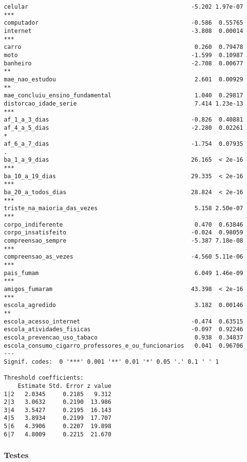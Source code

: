 \documentclass[
]{article}
\begin{document}
\begin{verbatim}
celular                                               -5.202 1.97e-07 ***
computador                                            -0.586  0.55765    
internet                                              -3.808  0.00014 ***
carro                                                  0.260  0.79478    
moto                                                  -1.599  0.10987    
banheiro                                              -2.708  0.00677 ** 
mae_nao_estudou                                        2.601  0.00929 ** 
mae_concluiu_ensino_fundamental                        1.040  0.29817    
distorcao_idade_serie                                  7.414 1.23e-13 ***
af_1_a_3_dias                                         -0.826  0.40881    
af_4_a_5_dias                                         -2.280  0.02261 *  
af_6_a_7_dias                                         -1.754  0.07935 .  
ba_1_a_9_dias                                         26.165  < 2e-16 ***
ba_10_a_19_dias                                       29.335  < 2e-16 ***
ba_20_a_todos_dias                                    28.824  < 2e-16 ***
triste_na_maioria_das_vezes                            5.158 2.50e-07 ***
corpo_indiferente                                      0.470  0.63846    
corpo_insatisfeito                                    -0.024  0.98059    
compreensao_sempre                                    -5.387 7.18e-08 ***
compreensao_as_vezes                                  -4.560 5.11e-06 ***
pais_fumam                                             6.049 1.46e-09 ***
amigos_fumaram                                        43.398  < 2e-16 ***
escola_agredido                                        3.182  0.00146 ** 
escola_acesso_internet                                -0.474  0.63515    
escola_atividades_fisicas                             -0.097  0.92246    
escola_prevencao_uso_tabaco                            0.938  0.34837    
escola_consumo_cigarro_professores_e_ou_funcionarios   0.041  0.96706    
---
Signif. codes:  0 '***' 0.001 '**' 0.01 '*' 0.05 '.' 0.1 ' ' 1

Threshold coefficients:
    Estimate Std. Error z value
1|2   2.0345     0.2185   9.312
2|3   3.0632     0.2190  13.986
3|4   3.5427     0.2195  16.143
4|5   3.8934     0.2199  17.707
5|6   4.3906     0.2207  19.898
6|7   4.8009     0.2215  21.670
\end{verbatim}

\hypertarget{testes}{%
\subsubsection{Testes}\label{testes}}
\end{document}
